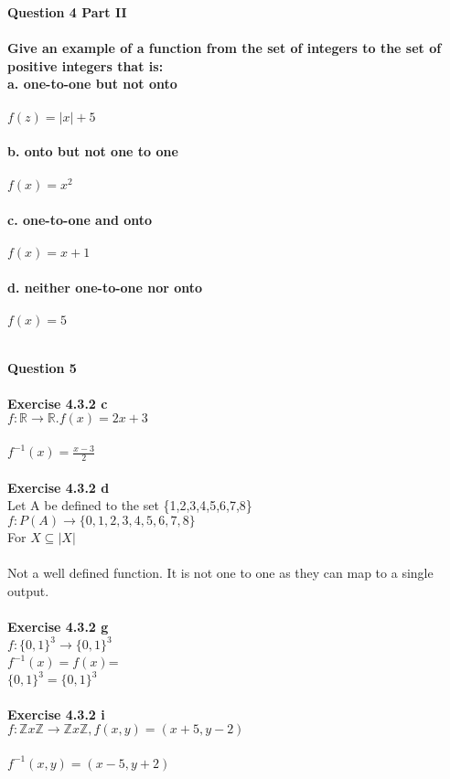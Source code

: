 \documentclass[11pt]{article}
\begin{document}
\noindent \textbf{Question 4 Part II}\\\\
\textbf{Give an example of a function from the set of integers to the set of positive integers that is:}\\
\textbf{a. one-to-one but not onto }\\\\
$f(z) = |x| + 5$\\\\
\textbf{b. onto but not one to one }\\\\
$f(x) = x^2$\\\\
\textbf{c. one-to-one and onto }\\\\
$f(x) = x + 1$\\\\
\textbf{d. neither one-to-one nor onto }\\\\
$f(x) = 5$\\\\

\newpage

\noindent \textbf{Question 5}\\\\
\textbf{Exercise 4.3.2 c}\\
$f: \mathbb{R} \rightarrow \mathbb{R}. f(x) = 2x + 3$\\\\
$f^{-1}(x) = \frac{x-3}{2}$\\\\
\textbf{Exercise 4.3.2 d}\\
Let A be defined to the set \{1,2,3,4,5,6,7,8\}\\
$f: P(A) \rightarrow \{0,1,2,3,4,5,6,7,8\}$\\
For $X \subseteq |X|$\\\\
Not a well defined function. It is not one to one as they can map to a single output.\\\\
\textbf{Exercise 4.3.2 g}\\
$f: \{0,1\}^3 \rightarrow \{0,1\}^3$\\
$f^{-1}(x) = f(x)$=\\  
$\{0,1\}^3 = \{0,1\}^3$\\\\
\textbf{Exercise 4.3.2 i}\\
$f: \mathbb{Z} x \mathbb{Z} \rightarrow \mathbb{Z} x \mathbb{Z}, f(x,y) = (x + 5, y - 2)$ \\\\
$f^{-1}(x,y) = (x-5, y+2)$\\\\
\newpage
\end{document}
